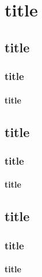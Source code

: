 \documentclass[12pt,a4paper,x11names,usenames,dvipsnames,svgnames,oneside]{book}
\begin{document}
	\chapter{title}
	\section{title}\subsection{title}\subsubsection{title}
	\section{title}\subsection{title}\subsubsection{title}
	\section{title}\subsection{title}\subsubsection{title}
\end{document}
